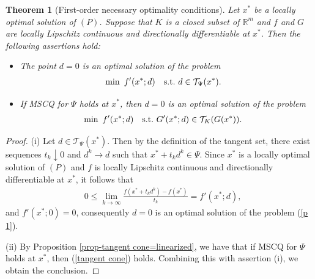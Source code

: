 \documentclass[11pt]{article}
\newtheorem{theorem}{Theorem}[section]
\theoremstyle{definition}
\theoremstyle{remark}
\numberwithin{equation}{section}
\begin{document}
\begin{theorem}[First-order necessary optimality conditions]\label{thm FONC for nonsmooth}
 Let $x^*$ be a locally optimal solution of $(P)$. Suppose that $K$ is a closed subset of $\mathbb{R}^m$ and
 $f$ and $G$ are locally Lipschitz continuous and directionally differentiable at $x^*$. Then the
 following assertions hold:
 \begin{itemize}
   \item[(i)]The point $d=0$ is an optimal solution of the problem
   \begin{align}\label{p 1}
      & \min~  f'(x^*;d)~~~{\rm s.t.}~ d\in \mathcal{T}_{\Psi}(x^*).
   \end{align}
   \item [(ii)]If MSCQ for $\Psi$ holds at $x^*$, then $d=0$ is an optimal solution of the problem
   \begin{align}%
      & \min ~ f'(x^*;d)~~~{\rm s.t.}~G'(x^*;d)\in \mathcal{T}_{K}(G(x^*)).\notag
   \end{align}
 \end{itemize}
\end{theorem}
\begin{proof}
  (i) Let $d\in \mathcal{T}_{\Psi}(x^*)$. Then by the definition of the tangent set, there
exist sequences $t_k\downarrow 0$ and $d^k\to d$ such that $x^*+t_kd^k\in \Psi$. Since $x^*$ is a
locally optimal solution of $(P)$ and $f$ is locally Lipschitz continuous and directionally differentiable at
$x^*$, it follows that
\begin{align*}
   & 0\le \lim_{k\to \infty}\frac{f(x^*+t_k d^k)-f(x^*)}{t_k}=f'(x^*;d),
\end{align*}
and $f'(x^*;0)=0$, consequently $d=0$ is an optimal solution of the problem (\ref{p 1}).

(ii) By Proposition \ref{prop-tangent cone=linearized}, we have that if MSCQ for $\Psi$ holds at $x^*$, then
(\ref{tangent cone}) holds.
Combining this with assertion (i), we obtain the conclusion.
\end{proof}
\end{document}
